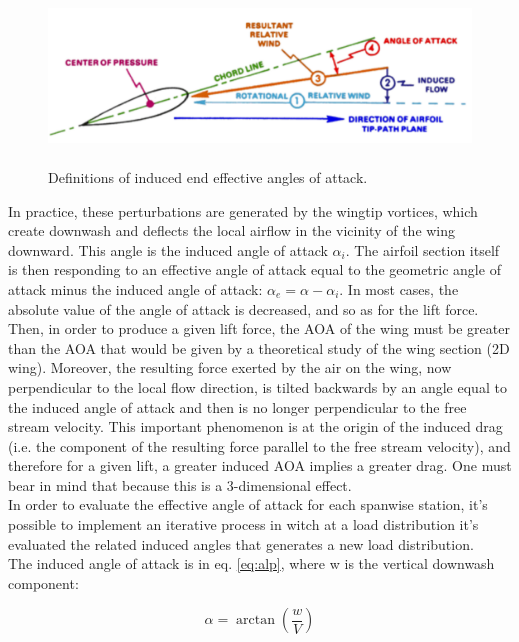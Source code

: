\begin{figure}[H]
\centering
{\includegraphics[height=3.9cm]{Immagini/induced}} 
\caption{Definitions of induced end effective angles of attack.}
\end{figure}

In practice, these perturbations are generated by the wingtip vortices, which create downwash and deflects the local airflow in the vicinity of the wing downward. This angle is the induced angle of attack $\alpha_i$. The airfoil section itself is then responding to an effective angle of attack equal to the geometric angle of attack minus the induced angle of attack: $\alpha_e=\alpha-\alpha_i$. In most cases, the absolute value of the angle of attack is decreased, and so as for the lift force. Then, in order to produce a given lift force, the AOA of the wing must be greater than the AOA that would be given by a theoretical study of the wing section (2D wing). Moreover, the resulting force exerted by the air on the wing, now perpendicular to the local flow direction, is tilted backwards by an angle equal to the induced angle of attack and then is no longer perpendicular to the free stream velocity. This important phenomenon is at the origin of the induced drag (i.e. the component of the resulting force parallel to the free stream velocity), and therefore for a given lift, a greater induced AOA implies a greater drag. One must bear in mind that because this is a 3-dimensional effect.\cite{induced}\\

In order to evaluate the effective angle of attack  for each spanwise station, it's possible to implement an iterative process in witch at a load distribution it's evaluated the related induced angles that generates a new load distribution.\\
The induced angle of attack is in eq. \ref{eq:alp},  where w is the vertical downwash component:

\begin{equation}
\alpha =\arctan\left( {\frac{w}{V}}\right )
\label{eq:alp}
\end{equation}

